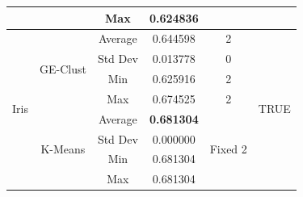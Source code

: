 \documentclass[journal]{IEEEtran}
\begin{document}
\begin{table}[]
\begin{tabular}{|c|c|c|c|c|c|}
			&                               & Max                            & 0.624836                    &                          &                       \\ \hline
			\multirow{8}{*}{Iris}                  & \multirow{4}{*}{GE-Clust}           & Average                        & 0.644598                   & 2                        & \multirow{8}{*}{TRUE} \\ \cline{3-5}
			&                               & Std Dev                        & 0.013778                   & 0                        &                       \\ \cline{3-5}
			&                               & Min                            & 0.625916                   & 2                        &                       \\ \cline{3-5}
			&                               & Max                            & 0.674525                   & 2                        &                       \\ \cline{2-5}
			& \multirow{4}{*}{K-Means}      & Average                        & \textbf{0.681304}                   & \multirow{4}{*}{Fixed 2} &                       \\ \cline{3-4}
			&                               & Std Dev                        & 0.000000                   &                          &                       \\ \cline{3-4}
			&                               & Min                            & 0.681304                   &                          &                       \\ \cline{3-4}
			&                               & Max                            & 0.681304                   &                          &                       \\ \cline{3-4}							\hline
		\end{tabular}
	\end{table}
	
\end{document}
